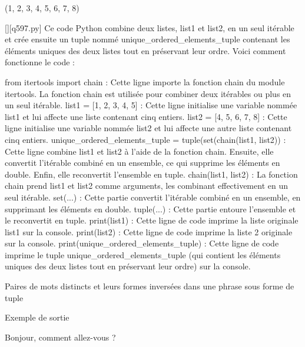 (1, 2, 3, 4, 5, 6, 7, 8)
        \par
        \begin{solution}
            \renewcommand{\nomfichier}{q597.py}
            \pythonfile{\chemincode \nomfichier}[][\nomfichier]
            Ce code Python combine deux listes, list1 et list2, en un seul itérable et crée ensuite un tuple nommé unique\_ordered\_elements\_tuple contenant les éléments uniques des deux listes tout en préservant leur ordre. Voici comment fonctionne le code :

    from itertools import chain : Cette ligne importe la fonction chain du module itertools. La fonction chain est utilisée pour combiner deux itérables ou plus en un seul itérable.
    list1 = [1, 2, 3, 4, 5] : Cette ligne initialise une variable nommée list1 et lui affecte une liste contenant cinq entiers.
    list2 = [4, 5, 6, 7, 8] : Cette ligne initialise une variable nommée list2 et lui affecte une autre liste contenant cinq entiers.
    unique\_ordered\_elements\_tuple = tuple(set(chain(list1, list2)) : Cette ligne combine list1 et list2 à l'aide de la fonction chain. Ensuite, elle convertit l'itérable combiné en un ensemble, ce qui supprime les éléments en double. Enfin, elle reconvertit l'ensemble en tuple.
        chain(list1, list2) : La fonction chain prend list1 et list2 comme arguments, les combinant effectivement en un seul itérable.
        set(...) : Cette partie convertit l'itérable combiné en un ensemble, en supprimant les éléments en double.
        tuple(...) : Cette partie entoure l'ensemble et le reconvertit en tuple.
    print(list1) : Cette ligne de code imprime la liste originale list1 sur la console.
    print(list2) : Cette ligne de code imprime la liste 2 originale sur la console.
    print(unique\_ordered\_elements\_tuple) : Cette ligne de code imprime le tuple unique\_ordered\_elements\_tuple (qui contient les éléments uniques des deux listes tout en préservant leur ordre) sur la console.
        \end{solution}
        

        \question
        Paires de mots distincts et leurs formes inversées dans une phrase sous forme de tuple

Exemple de sortie

Bonjour, comment allez-vous ?

